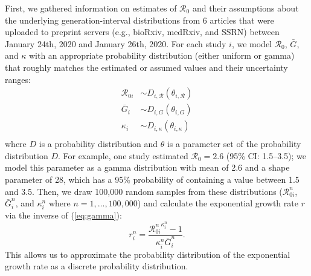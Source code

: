 \documentclass[12pt]{article}
\newcommand{\eref}[1]{(\ref{eq:#1})}
\begin{document}
First, we gathered information on estimates of $\mathcal R_0$ and their
assumptions about the underlying generation-interval distributions from
6 articles that were uploaded to
preprint servers (e.g., bioRxiv, medRxiv, and SSRN) between January 24th, 2020 and January 26th, 2020.
For each study $i$, we model $\mathcal R_0$, $\bar G$, and $\kappa$ with an appropriate probability distribution (either uniform or gamma) that roughly matches the estimated or assumed values and their uncertainty ranges:
\begin{equation}
\begin{aligned}
\mathcal R_{0i} &\sim D_{i, \mathcal R}(\theta_{i, \mathcal R})\\
{\bar G}_i &\sim D_{i, G}(\theta_{i, G})\\
\kappa_i &\sim D_{i, \kappa}(\theta_{i, \kappa})\\
\end{aligned}
\end{equation}
where $D$ is a probability distribution and $\theta$ is a parameter set of the probability distribution $D$.
For example, one study estimated $\mathcal R_0 = 2.6$ (95\% CI: 1.5--3.5);
we model this parameter as a gamma distribution with mean of 2.6 and a shape parameter of 28, which has a 95\% probability of containing a value between 1.5 and 3.5.
Then, we draw 100,000 random samples from these distributions ($\mathcal R_{0i}^n$, ${\bar G}_i^n$, and $\kappa_i^n$ where $n = 1, \dots, 100,000$) and calculate the exponential growth rate $r$ via the inverse of \eref{gamma}:
\begin{equation}
r_i^n = \frac{{\mathcal R_{0i}^n}^{\kappa_i^n} - 1}{\kappa_i^n \bar{G}_i^n}.
\end{equation}
This allows us to approximate the probability distribution of the exponential growth rate as a discrete probability distribution.
\end{document}
